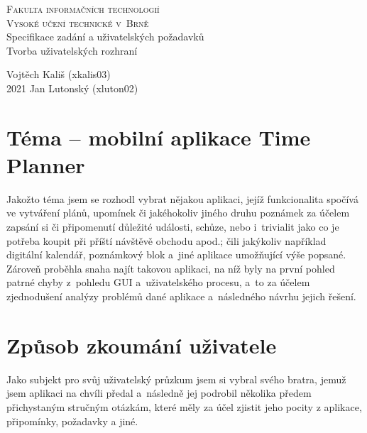 \documentclass[a4paper, 11pt, twocolumn]{article}
\theoremstyle{definition}
\theoremstyle{plain}
\begin{document}
	\begin{titlepage}
		\begin{center}
			{\Huge\textsc{Fakulta informačních technologií \\ \vspace*{0.2cm} Vysoké učení technické v~Brně}}\\
			\huge {Specifikace zadání a uživatelských požadavků} \\
			\Large {Tvorba uživatelských rozhraní} \\
		\end{center}

		\Large{\hfill Vojtěch Kališ (xkalis03)} \\
		\Large{2021 \hfill Jan Lutonský (xluton02)}
	\end{titlepage}
	

	\section*{\large{Téma -- mobilní aplikace Time Planner}}
	\vspace*{-0.2cm}
	Jakožto téma jsem se rozhodl vybrat nějakou aplikaci, jejíž funkcionalita spočívá ve vytváření plánů, upomínek či jakéhokoliv jiného druhu poznámek za
	účelem zapsání si či připomenutí důležité události, schůze, nebo i~trivialit jako co je potřeba koupit při příští návštěvě obchodu apod.; čili jakýkoliv 
	například digitální kalendář, poznámkový blok a~jiné aplikace umožňující výše popsané. Zároveň proběhla snaha najít takovou aplikaci, na níž byly na
	první pohled patrné chyby z~pohledu GUI a~uživatelského procesu, a~to za účelem zjednodušení analýzy problémů dané aplikace a~následného návrhu
	jejich řešení.
	
	\section*{\large{Způsob zkoumání uživatele}}
	\vspace*{-0.2cm}
	Jako subjekt pro svůj uživatelský průzkum jsem si vybral svého bratra, jemuž jsem aplikaci na chvíli předal a~následně jej podrobil několika předem 
	přichystaným stručným otázkám, které měly za účel zjistit jeho pocity z aplikace, připomínky, požadavky a jiné.
\end{document}
